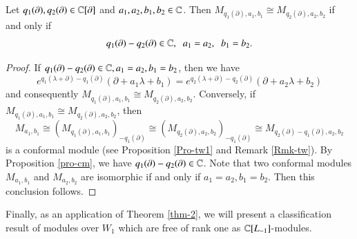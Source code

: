\documentclass[12pt]{amsart}
\begin{document}
\begin{pro}Let $q_1(\partial), q_2(\partial)\in\mathbb{C}[\partial]$ and $a_1,a_2,b_1,b_2\in\mathbb{C}$. Then
$M_{q_1(\partial), a_1,b_1}\cong M_{q_2(\partial), a_2,b_2}$ if and only if $$q_1(\partial)-q_2(\partial)\in\mathbb{C},\;\; a_1=a_2,\;\;b_1=b_2.$$
\end{pro}
\begin{proof}
If $q_1(\partial)-q_2(\partial)\in\mathbb{C}, a_1=a_2,b_1=b_2$, then we have
$$e^{q_1(\lambda+\partial)-q_1(\partial)}(\partial+a_1\lambda+b_1)=
e^{q_2(\lambda+\partial)-q_2(\partial)}(\partial+a_2\lambda+b_2)$$ and consequently $M_{q_1(\partial), a_1,b_1}\cong M_{q_2(\partial), a_2,b_2}$.
Conversely, if $M_{q_1(\partial), a_1,b_1}\cong M_{q_2(\partial), a_2,b_2}$, then $$M_{a_1,b_1}\cong(M_{q_1(\partial), a_1,b_1})_{-q_1(\partial)}\cong (M_{q_2(\partial), a_2,b_2})_{-q_1(\partial)}\cong M_{q_2(\partial)-q_1(\partial), a_2,b_2}$$ is a conformal module (see Proposition \ref{Pro-tw1} and Remark \ref{Rmk-tw}). By Proposition \ref{pro-cm}, we have $q_1(\partial)-q_2(\partial)\in\mathbb{C}$. Note that two conformal modules $M_{a_1,b_1}$ and $M_{a_2, b_2}$ are isomorphic if and only if $a_1=a_2, b_1=b_2$. Then this conclusion follows.
\end{proof}

Finally, as an application of Theorem \ref{thm-2}, we will present a classification result of modules over $W_1$ which are free of rank one as $\mathbb{C}[L_{-1}]$-modules.%
\end{document}
